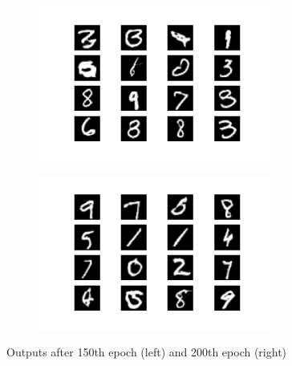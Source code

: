 \documentclass{article}
\begin{document}
\begin{appendices}
\begin{figure}[H]
\centering
\begin{subfigure}{.5\textwidth}
  \centering
  \includegraphics[width=3in]{csci-8110/hw-4/images/generated_plot_e150.png}
  \label{fig:ep150}
\end{subfigure}%
\begin{subfigure}{.5\textwidth}
  \centering
  \includegraphics[width=3in]{csci-8110/hw-4/images/generated_plot_e200.png}
  \label{fig:ep200}
\end{subfigure}
\caption{Outputs after 150th epoch (left) and 200th epoch (right)}
\label{fig:ep20-100}
\end{figure}


\end{appendices}
\end{document}

